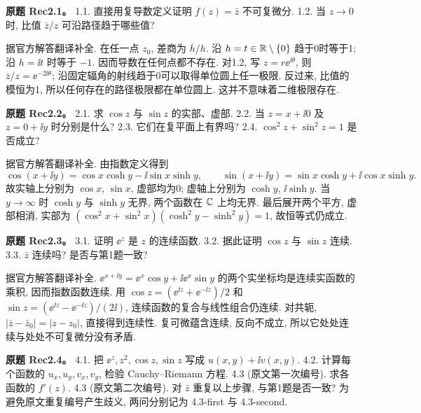 \begin{exercise}
\textbf{原题 Rec2.1。}\label{ass:rec2-1}
1.1. 直接用复导数定义证明 $f(z)=\bar z$ 不可复微分. 1.2. 当 $z\to0$ 时, 比值 $\bar z/z$ 可沿路径趋于哪些值?
\end{exercise}
\begin{solution}
据官方解答翻译补全. 在任一点 $z_0$, 差商为 $\overline h/h$. 沿 $h=t\in\mathbb R\setminus\{0\}$ 趋于0时等于1; 沿 $h=\ii t$ 时等于 $-1$. 因而导数在任何点都不存在. 对1.2, 写 $z=r\ee^{\ii\theta}$, 则 $\bar z/z=\ee^{-2\ii\theta}$; 沿固定辐角的射线趋于0可以取得单位圆上任一极限. 反过来, 比值的模恒为1, 所以任何存在的路径极限都在单位圆上. 这并不意味着二维极限存在.
\end{solution}
\begin{exercise}
\textbf{原题 Rec2.2。}\label{ass:rec2-2}
2.1. 求 $\cos z$ 与 $\sin z$ 的实部、虚部. 2.2. 当 $z=x+\ii0$ 及 $z=0+\ii y$ 时分别是什么? 2.3. 它们在复平面上有界吗? 2.4. $\cos^2z+\sin^2z=1$ 是否成立?
\end{exercise}
\begin{solution}
据官方解答翻译补全. 由指数定义得到
\[
\cos(x+\ii y)=\cos x\cosh y-\ii\sin x\sinh y,\qquad
\sin(x+\ii y)=\sin x\cosh y+\ii\cos x\sinh y.
\]
故实轴上分别为 $\cos x$, $\sin x$, 虚部均为0; 虚轴上分别为 $\cosh y$, $\ii\sinh y$. 当 $y\to\infty$ 时 $\cosh y$ 与 $\sinh y$ 无界, 两个函数在 $\mathbb C$ 上均无界. 最后展开两个平方, 虚部相消, 实部为 $(\cos^2x+\sin^2x)(\cosh^2y-\sinh^2y)=1$, 故恒等式仍成立.
\end{solution}
\begin{exercise}
\textbf{原题 Rec2.3。}\label{ass:rec2-3}
3.1. 证明 $\ee^z$ 是 $z$ 的连续函数. 3.2. 据此证明 $\cos z$ 与 $\sin z$ 连续. 3.3. $\bar z$ 连续吗? 是否与第1题一致?
\end{exercise}
\begin{solution}
据官方解答翻译补全. $\ee^{x+\ii y}=\ee^x\cos y+\ii\ee^x\sin y$ 的两个实坐标均是连续实函数的乘积, 因而指数函数连续. 用 $\cos z=(\ee^{\ii z}+\ee^{-\ii z})/2$ 和 $\sin z=(\ee^{\ii z}-\ee^{-\ii z})/(2\ii)$, 连续函数的复合与线性组合仍连续. 对共轭, $|\bar z-\bar z_0|=|z-z_0|$, 直接得到连续性. 复可微蕴含连续, 反向不成立, 所以它处处连续与处处不可复微分没有矛盾.
\end{solution}
\begin{exercise}
\textbf{原题 Rec2.4。}\label{ass:rec2-4}
4.1. 把 $\ee^z,z^2,\cos z,\sin z$ 写成 $u(x,y)+\ii v(x,y)$. 4.2. 计算每个函数的 $u_x,u_y,v_x,v_y$, 检验 Cauchy--Riemann 方程. 4.3 (原文第一次编号). 求各函数的 $f'(z)$. 4.3 (原文第二次编号). 对 $\bar z$ 重复以上步骤, 与第1题是否一致? 为避免原文重复编号产生歧义, 两问分别记为 4.3-first 与 4.3-second.
\end{exercise}
